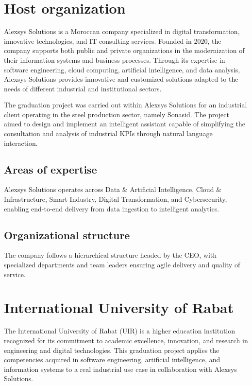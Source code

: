 \documentclass[12pt,a4paper,openany]{report}
\begin{document}
\section{Host organization}
Alexsys Solutions is a Moroccan company specialized in digital transformation, innovative technologies, and IT consulting services. Founded in 2020, the company supports both public and private organizations in the modernization of their information systems and business processes. Through its expertise in software engineering, cloud computing, artificial intelligence, and data analysis, Alexsys Solutions provides innovative and customized solutions adapted to the needs of different industrial and institutional sectors.

The graduation project was carried out within Alexsys Solutions for an industrial client operating in the steel production sector, namely Sonasid. The project aimed to design and implement an intelligent assistant capable of simplifying the consultation and analysis of industrial KPIs through natural language interaction.

\subsection{Areas of expertise}
Alexsys Solutions operates across Data \& Artificial Intelligence, Cloud \& Infrastructure, Smart Industry, Digital Transformation, and Cybersecurity, enabling end-to-end delivery from data ingestion to intelligent analytics.

\subsection{Organizational structure}
The company follows a hierarchical structure headed by the CEO, with specialized departments and team leaders ensuring agile delivery and quality of service.

\section{International University of Rabat}
The International University of Rabat (UIR) is a higher education institution recognized for its commitment to academic excellence, innovation, and research in engineering and digital technologies. This graduation project applies the competencies acquired in software engineering, artificial intelligence, and information systems to a real industrial use case in collaboration with Alexsys Solutions.
\end{document}
